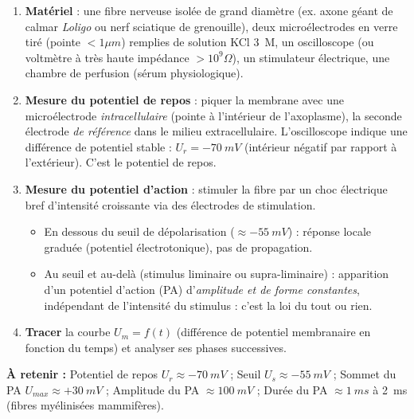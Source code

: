 \documentclass[11pt]{article}
\newcommand{\cle}[1]{{\popxbold\color{popdark}#1}}
\begin{document}
\begin{methode}
\begin{enumerate}
\item \textbf{Matériel} : une fibre nerveuse isolée de grand diamètre (ex. axone géant de calmar \emph{Loligo} ou nerf sciatique de grenouille), deux microélectrodes en verre tiré (pointe $< 1 \mu m$) remplies de solution KCl \SI{3}{M}, un oscilloscope (ou voltmètre à très haute impédance $> 10^9 \Omega$), un stimulateur électrique, une chambre de perfusion (sérum physiologique).
\item \textbf{Mesure du potentiel de repos} : piquer la membrane avec une microélectrode \emph{intracellulaire} (pointe à l'intérieur de l'axoplasme), la seconde électrode \emph{de référence} dans le milieu extracellulaire. L'oscilloscope indique une différence de potentiel stable : $U_r = -\SI{70}{mV}$ (intérieur négatif par rapport à l'extérieur). C'est le \cle{potentiel de repos}.
\item \textbf{Mesure du potentiel d'action} : stimuler la fibre par un choc électrique bref d'intensité croissante via des électrodes de stimulation.
\begin{itemize}
\item En dessous du \cle{seuil de dépolarisation} ($\approx -\SI{55}{mV}$) : réponse locale graduée (potentiel électrotonique), pas de propagation.
\item Au seuil et au-delà (stimulus liminaire ou supra-liminaire) : apparition d'un \cle{potentiel d'action} (PA) d'\emph{amplitude et de forme constantes}, indépendant de l'intensité du stimulus : c'est la \cle{loi du tout ou rien}.
\end{itemize}
\item \textbf{Tracer} la courbe $U_m = f(t)$ (différence de potentiel membranaire en fonction du temps) et analyser ses phases successives.
\end{enumerate}
\textbf{À retenir :} Potentiel de repos $U_r \approx -\SI{70}{mV}$ ; Seuil $U_s \approx -\SI{55}{mV}$ ; Sommet du PA $U_{max} \approx +\SI{30}{mV}$ ; Amplitude du PA $\approx \SI{100}{mV}$ ; Durée du PA $\approx \SI{1}{ms}$ à \SI{2}{ms} (fibres myélinisées mammifères).
\end{methode}
\end{document}
